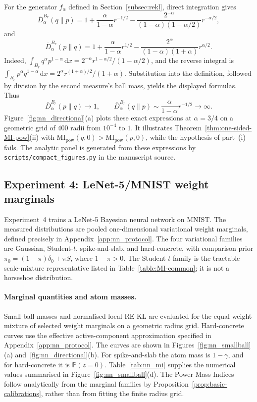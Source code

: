 \documentclass[11pt,a4paper]{article}
\newcommand{\MI}{\mathrm{MI}}
\theoremstyle{compactplain}
\theoremstyle{compactdefinition}
\numberwithin{equation}{section}
\begin{document}
For the generator \(f_\alpha\) defined in Section~\ref{subsec:rekl}, direct integration gives
\[
\overline D_\alpha^{B_r}(q\|p)
=1+\frac{\alpha}{1-\alpha}r^{-1/2}
-\frac{2^{-\alpha}}{(1-\alpha)(1-\alpha/2)}r^{-\alpha/2},
\]
and
\[
\overline D_\alpha^{B_r}(p\|q)
=1+\frac{\alpha}{1-\alpha}r^{1/2}
-\frac{2^\alpha}{(1-\alpha)(1+\alpha)}r^{\alpha/2}.
\]
Indeed, \(\int_{B_r}q^\alpha p^{1-\alpha}\,\mathrm dx
=2^{-\alpha}r^{1-\alpha/2}/(1-\alpha/2)\), and the reverse integral is
\(\int_{B_r}p^\alpha q^{1-\alpha}\,\mathrm dx
=2^\alpha r^{(1+\alpha)/2}/(1+\alpha)\).
Substitution into the definition, followed by division by the second measure's ball mass, yields the displayed formulas. Thus
\[
\overline D_\alpha^{B_r}(p\|q)\to1,
\qquad
\overline D_\alpha^{B_r}(q\|p)
\sim\frac{\alpha}{1-\alpha}r^{-1/2}\to\infty.
\]
Figure~\ref{fig:nn_directional}(a) plots these exact expressions at \(\alpha=3/4\) on a geometric grid of 400 radii from \(10^{-4}\) to \(1\). It illustrates Theorem~\ref{thm:one-sided-MI-pow}(ii) with \(\MI_{\mathrm{pow}}(q,0)>\MI_{\mathrm{pow}}(p,0)\), while the hypothesis of part~(i) fails. The analytic panel is generated from these expressions by \texttt{scripts/compact\_figures.py} in the manuscript source.

\subsection{Experiment 4: LeNet-5/MNIST weight marginals}
\label{app:lenet_experiment}

Experiment~4 trains a LeNet-5 Bayesian neural network on MNIST.
The measured distributions are pooled one-dimensional variational weight
marginals, defined precisely in Appendix~\ref{app:nn_protocol}.
The four variational families are Gaussian, Student-\(t\), spike-and-slab,
and hard-concrete, with comparison prior
\(\pi_0=(1-\pi)\delta_0+\pi S\), where \(1-\pi>0\).
The Student-\(t\) family is the tractable scale-mixture representative
listed in Table~\ref{table:MI-common}; it is not a horseshoe distribution.

\paragraph{Marginal quantities and atom masses.}
Small-ball masses and normalised local RE-KL are evaluated for the
equal-weight mixture of selected weight marginals on a geometric radius
grid. Hard-concrete curves use the effective active-component approximation
specified in Appendix~\ref{app:nn_protocol}. The curves are shown in
Figures~\ref{fig:nn_smallball}(a) and~\ref{fig:nn_directional}(b).
For spike-and-slab the atom mass is \(1-\gamma\), and for hard-concrete
it is \(\mathbb P(z=0)\). Table~\ref{tab:nn_mi} supplies the numerical
values summarised in Figure~\ref{fig:nn_smallball}(d).
The Power Mass Indices follow analytically from the marginal families
by Proposition~\ref{prop:basic-calibrations}, rather than from fitting
the finite radius grid.
\end{document}
